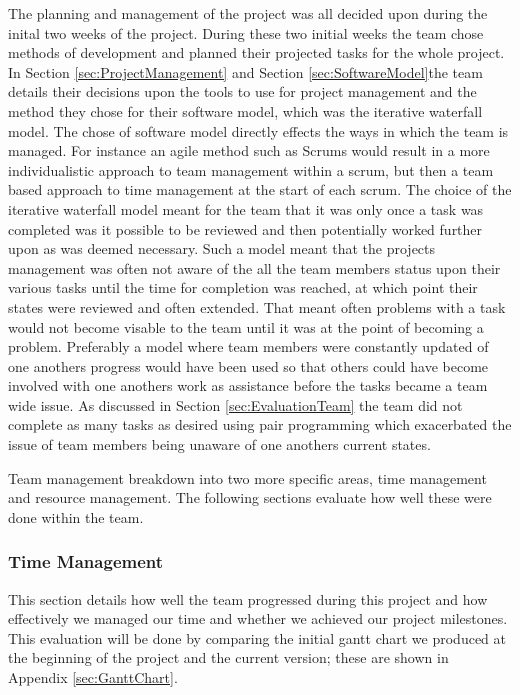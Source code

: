 The planning and management of the project was all decided upon during the
inital two weeks of the project. During these two initial weeks the team chose
methods of development and planned their projected tasks for the whole project.
In Section \ref{sec:ProjectManagement} and Section \ref{sec:SoftwareModel}the
team details their decisions upon the tools to use for project management and
the method they chose for their software model, which was the iterative
waterfall model. The chose of software model directly effects the ways in which
the team is managed. For instance an agile method such as Scrums would result in
a more individualistic approach to team management within a scrum, but then a
team based approach to time management at the start of each scrum. The choice of
the iterative waterfall model meant for the team that it was only once a task
was completed was it possible to be reviewed and then potentially worked
further upon as was deemed necessary. Such a model meant that the projects
management was often not aware of the all the team members status upon their
various tasks until the time for completion was reached, at which point their
states were reviewed and often extended. That meant often problems with a task
would not become visable to the team until it was at the point of becoming a
problem. Preferably a model where team members were constantly updated of one
anothers progress would have been used so that others could have become involved
with one anothers work as assistance before the tasks became a team wide issue.
As discussed in Section \ref{sec:EvaluationTeam} the team did not complete as
many tasks as desired using pair programming which exacerbated the issue of team
members being unaware of one anothers current states.

Team management breakdown into two more specific areas, time management and
resource management. The following sections evaluate how well these were done
within the team.

\subsubsection{Time Management}
\label{sec:timeManagementEval}
This section details how well the team progressed during this project and how effectively we managed our time and whether we achieved our project milestones. This evaluation will be done by comparing the initial gantt chart we produced at the beginning of the project and the current version; these are shown in Appendix \ref{sec:GanttChart}.


